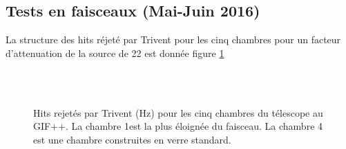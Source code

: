\subsection{Tests en faisceaux (Mai-Juin 2016)}
La structure des hits réjeté par Trivent pour les cinq chambres pour un facteur d'attenuation de la source de 22 est donnée figure \ref{struc}
\begin{figure}[ht!]
	\centering
	\hfill
	\\
	\hfill
	\\
	\caption{Hits rejetés par Trivent (\si{\hertz}) pour les cinq chambres du télescope au GIF++. La chambre 1est la plus éloignée du faisceau. La chambre 4 est une chambre construites en verre standard.}
	\label{struc}
\end{figure}

